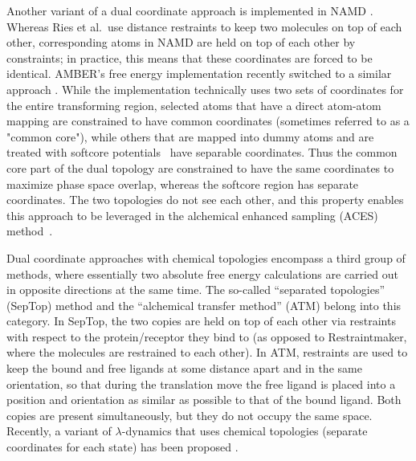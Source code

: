 \documentclass[9pt,bestpractices]{livecoms}
\begin{document}
Another variant of a dual coordinate approach is implemented in NAMD \cite{jiang2019computing}. Whereas Ries et al.\  use distance restraints to keep two molecules on top of each other, corresponding atoms in NAMD are held on top of each other by constraints; in practice, this means that these coordinates are forced to be identical. AMBER's free energy implementation recently switched to a similar approach \cite{lee2023aces,York_ACSPhysChemAu_2023_v3_p478}.
While the implementation technically uses two sets of coordinates for the entire transforming region, selected atoms that have a direct atom-atom mapping are constrained to have common coordinates (sometimes referred to as a "common core"), while others that are mapped into dummy atoms and are treated with softcore potentials~\cite{Lee_JChemTheoryComput_2020_v16_p5512,Tsai_JChemTheoryComput_2023_v19_p640} have separable coordinates.  Thus the common core part of the dual topology are constrained to have the same coordinates to maximize phase space overlap, whereas the softcore region has separate coordinates.  The two topologies do not see each other, and this property enables this approach to be leveraged in the alchemical enhanced sampling (ACES) method~\cite{lee2023aces,Tsai_JChemInfModel_2024_v64_p7046,Zhang_JChemTheoryComput_2024_v20_p3935}.

Dual coordinate approaches with chemical topologies encompass a third group of methods, where essentially two absolute free energy calculations are carried out in opposite directions at the same time.
The so-called ``separated topologies'' (SepTop) method \cite{rocklin2013separated,Baumann_2023} and the ``alchemical transfer method'' (ATM) \cite{Azimi_2022} belong into this category. In SepTop, the two copies are held on top of each other via restraints with respect to the protein/receptor they bind to (as opposed to Restraintmaker, where the molecules are restrained to each other). %
In ATM, restraints are used to keep the bound and free ligands at some distance apart and in the same orientation, so that during the translation move the free ligand is placed into a position and orientation as similar as possible to that of the bound ligand. Both copies are present simultaneously, but they do not occupy the same space. Recently, a variant of $\lambda$-dynamics that uses chemical topologies (separate coordinates for each state) has been proposed \cite{Liesen_2024}.
  
\end{document}
